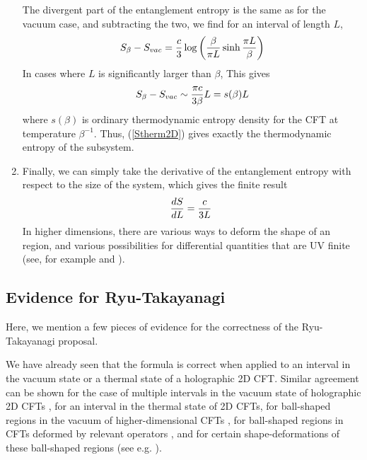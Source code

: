 \documentclass[12pt,epsf]{article}
\newcommand{\be}{\begin{equation}}
\newcommand{\ee}{\end{equation}}
\begin{document}
\begin{enumerate}
The divergent part of the entanglement entropy is the same as for the vacuum case, and subtracting the two, we find for an interval of length $L$,
\be
S_\beta - S_{vac} = {c \over 3} \log \left( {\beta \over \pi L} \sinh {\pi L \over \beta} \right)
\ee
In cases where $L$ is significantly larger than $\beta$, This gives
\be
\label{Stherm2D}
S_\beta - S_{vac} \sim  {\pi c \over 3 \beta} L = s(\beta) L
\ee
where $s(\beta)$ is ordinary thermodynamic entropy density for the CFT at temperature $\beta^{-1}$. Thus, (\ref{Stherm2D}) gives exactly the thermodynamic entropy of the subsystem.
\item
Finally, we can simply take the derivative of the entanglement entropy with respect to the size of the system, which gives the finite result
\be
{d S \over d L} = {c \over 3 L} \;
\ee
In higher dimensions, there are various ways to deform the shape of an region, and various possibilities for differential quantities that are UV finite (see, for example \cite{Liu:2012eea} and \cite{Bhattacharya:2014vja}).
\end{enumerate}





\subsection{Evidence for Ryu-Takayanagi}

Here, we mention a few pieces of evidence for the correctness of the Ryu-Takayanagi proposal.

We have already seen that the formula is correct when applied to an interval in the vacuum state or a thermal state of a holographic 2D CFT. Similar agreement can be shown for the case of multiple intervals in the vacuum state of holographic 2D CFTs \cite{Hartman:2013mia,Faulkner:2013yia}, for an interval in the thermal state of 2D CFTs, for ball-shaped regions in the vacuum of higher-dimensional CFTs \cite{casini2011towards}, for ball-shaped regions in CFTs deformed by relevant operators \cite{Faulkner:2014jva}, and for certain shape-deformations of these ball-shaped regions (see e.g. \cite{Faulkner:2015csl}).
\end{document}
